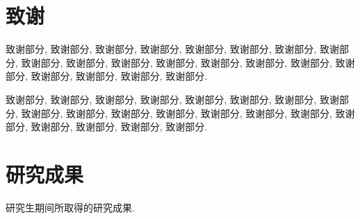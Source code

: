 \documentclass[UTF8,openright]{ctexbook}
\begin{document}
\chapter*{致谢}

致谢部分, 致谢部分, 致谢部分, 致谢部分, 致谢部分,
致谢部分, 致谢部分, 致谢部分, 致谢部分, 致谢部分,
致谢部分, 致谢部分, 致谢部分, 致谢部分, 致谢部分,
致谢部分, 致谢部分, 致谢部分, 致谢部分, 致谢部分.

致谢部分, 致谢部分, 致谢部分, 致谢部分, 致谢部分,
致谢部分, 致谢部分, 致谢部分, 致谢部分, 致谢部分,
致谢部分, 致谢部分, 致谢部分, 致谢部分, 致谢部分,
致谢部分, 致谢部分, 致谢部分, 致谢部分, 致谢部分.

\clearpage{\pagestyle{empty}\cleardoublepage}
\chapter*{研究成果}

研究生期间所取得的研究成果.
\end{document}
